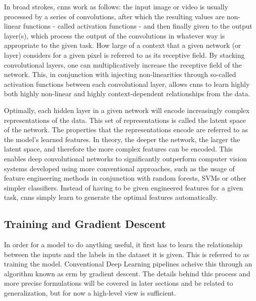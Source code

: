         In broad strokes, \glspl{cnn} work as follows: the input image or video is usually processed by a series of convolutions, after which the resulting values are non-linear functions - called activation functions - and then finally given to the output layer(s), which process the output of the convolutions in whatever way is appropriate to the given task. 
        How large of a context that a given network (or layer) considers for a given pixel is referred to as its receptive field. By stacking convolutional layers, one can multiplicatively increase the receptive field of the network. This, in conjunction with injecting non-linearities through so-called activation functions between each convolutional layer, allows \glspl{cnn} to learn highly both highly non-linear and highly context-dependent relationships from the data. 
        
        Optimally, each hidden layer in a given network will encode increasingly complex representations of the data. This set of representations is called the latent space of the network. The properties that the representations encode are referred to as the model's learned features. In theory, the deeper the network, the larger the latent space, and therefore the more complex features can be encoded. This enables deep convolutional networks to significantly outperform computer vision systems developed using more conventional approaches, such as the usage of feature engineering methods in conjunction with random forests, SVMs or other simpler classifiers. Instead of having to be given engineered features for a given task, \glspl{cnn} simply learn to generate the optimal features automatically.
        
    \subsection{Training and Gradient Descent}
        In order for a model to do anything useful, it first has to learn the relationship between the inputs and the labels in the dataset it is given. This is referred to as training the model. Conventional Deep Learning pipelines acheive this through an algorithm known as \gls{erm} by gradient descent. The details behind this process and more precise formulations will be covered in later sections and be related to generalization, but for now a high-level view is sufficient. 
        
